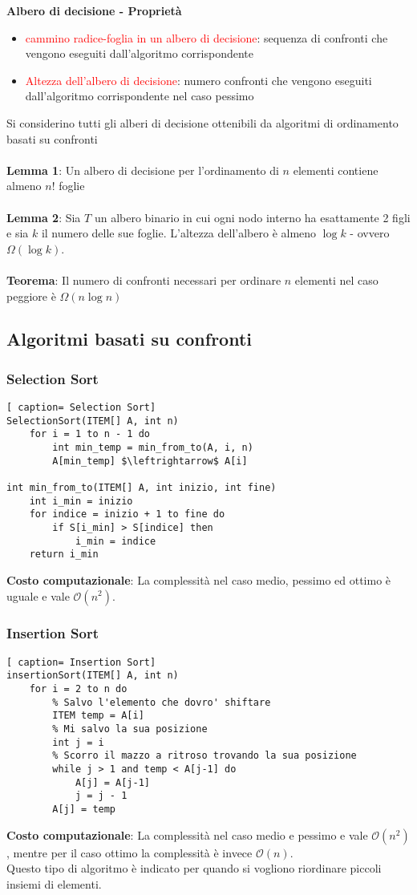 \documentclass[../cheatSheetAlgoritmi.tex]{subfiles}
\begin{document}
\textbf{Albero di decisione - Proprietà}
\begin{itemize}
	\item \textcolor{red}{cammino radice-foglia in un albero di decisione}: sequenza di confronti che vengono eseguiti dall'algoritmo corrispondente
	\item \textcolor{red}{Altezza dell'albero di decisione}: numero confronti che vengono eseguiti dall'algoritmo corrispondente nel caso pessimo
\end{itemize}
Si considerino tutti gli alberi di decisione ottenibili da algoritmi di ordinamento basati su confronti\\\\
\textbf{Lemma 1}: Un albero di decisione per l'ordinamento di $n$ elementi contiene almeno $n!$ foglie\\\\
\textbf{Lemma 2}: Sia $T$ un albero binario in cui ogni nodo interno ha esattamente 2
figli e sia $k$ il numero delle sue foglie. L'altezza dell'albero è almeno $\log k$ - ovvero $\Omega(\log k)$.\\\\
\textbf{Teorema}: Il numero di confronti necessari per ordinare $n$ elementi nel caso
peggiore è $\Omega(n \log n)$
\newpage
\subsection{Algoritmi basati su confronti}
\subsubsection{Selection Sort}
\begin{lstlisting}[ caption= Selection Sort]
SelectionSort(ITEM[] A, int n)
	for i = 1 to n - 1 do
		int min_temp = min_from_to(A, i, n)
		A[min_temp] $\leftrightarrow$ A[i]

int min_from_to(ITEM[] A, int inizio, int fine)
	int i_min = inizio
  	for indice = inizio + 1 to fine do
		if S[i_min] > S[indice] then
			i_min = indice
	return i_min
\end{lstlisting}
\textbf{Costo computazionale}: La complessità nel caso medio, pessimo ed ottimo è uguale e vale $\mathcal{O}(n^{2})$.
\subsubsection{Insertion Sort}
\begin{lstlisting}[ caption= Insertion Sort]
insertionSort(ITEM[] A, int n)
	for i = 2 to n do
		% Salvo l'elemento che dovro' shiftare
		ITEM temp = A[i]
		% Mi salvo la sua posizione
		int j = i
		% Scorro il mazzo a ritroso trovando la sua posizione
		while j > 1 and temp < A[j-1] do
			A[j] = A[j-1]
			j = j - 1
		A[j] = temp
\end{lstlisting}
\textbf{Costo computazionale}: La complessità nel caso medio e pessimo  e vale $\mathcal{O}(n^{2})$, mentre per il caso ottimo la complessità è invece $\mathcal{O}(n)$. \\
Questo tipo di algoritmo è indicato per quando si vogliono riordinare piccoli insiemi di elementi.
\newpage
\end{document}
